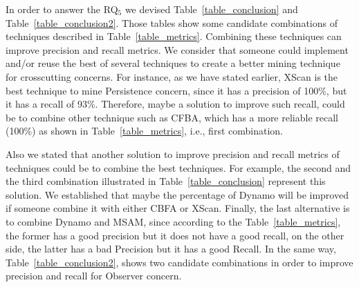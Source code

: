 In order to answer the RQ$_5$ we devised Table~\ref{table_conclusion} and Table~\ref{table_conclusion2}. Those tables show some candidate combinations of techniques described in Table~\ref{table_metrics}. Combining these techniques can improve precision and recall metrics. We consider that someone could implement and/or reuse the best of several techniques to create a better mining technique for crosscutting concerns. For instance, as we have stated earlier, XScan is the best technique to mine Persistence concern, since it  has a precision of 100\%, but it has a recall of 93\%. Therefore, maybe a solution to improve such recall, could be to combine other technique such as CFBA, which has a more reliable recall (100\%) as shown in Table~\ref{table_metrics}, i.e., first combination.

Also we stated that another solution to improve precision and recall metrics of techniques could be to combine the best techniques. For example, the second and the third combination illustrated in Table~\ref{table_conclusion} represent this solution. We established that maybe the percentage of Dynamo will be improved if someone combine it with either CBFA or XScan. Finally, the last alternative is to combine Dynamo and MSAM, since according to the Table~\ref{table_metrics}, the former has a good precision but it does not have a good recall, on the other side, the latter has a bad Precision but it has a good Recall. In the same way, Table~\ref{table_conclusion2}, shows two candidate combinations in order to improve precision and recall for Observer concern.




